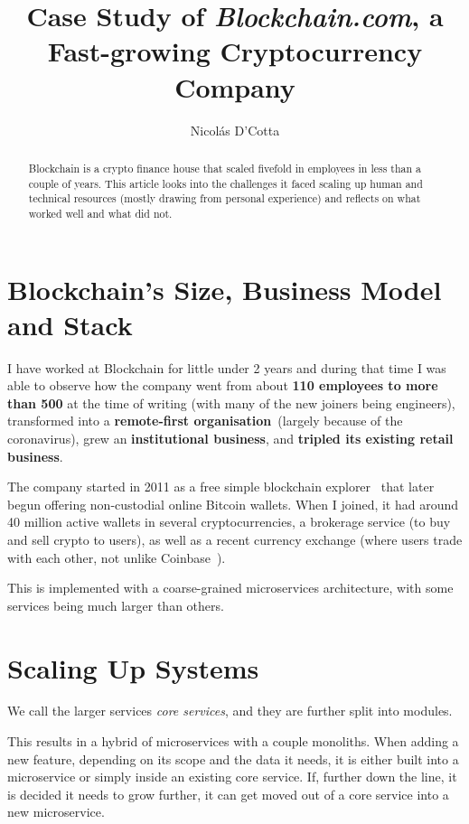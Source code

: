 \documentclass[conference]{IEEEtran}
\title{Case Study of \emph{Blockchain.com}, a Fast-growing Cryptocurrency Company}
\begin{document}
    \author{Nicolás D'Cotta}

    \maketitle

    \begin{abstract}
        Blockchain is a crypto finance house that scaled fivefold in
        employees in less than a couple of years.
        This article looks into the challenges it faced scaling up human and
        technical resources (mostly drawing from personal experience) and reflects
        on what worked well and what did not.
    \end{abstract}


    \section{Blockchain's Size, Business Model and Stack}\label{sec:business}

    I have worked at Blockchain for little under 2 years and during that time I was able to observe
    how the company went from about \textbf{110 employees to more than 500} at the time of writing (with many
    of the new joiners being engineers), transformed into a \textbf{remote-first organisation}~(largely because
    of the coronavirus), grew an \textbf{institutional business}, and \textbf{tripled its existing retail business}.

    The company started in 2011 as a free simple blockchain explorer~\cite{bcAbout} that later
    begun offering non-custodial online Bitcoin wallets.
    When I joined, it had around 40 million active wallets in several cryptocurrencies,
    a brokerage service (to buy and sell crypto to users), as well as a recent currency
    exchange (where users trade with each other, not unlike Coinbase~\cite{coinbasePro}).

    This is implemented with a coarse-grained microservices architecture, with some services
    being much larger than others.


    \section{Scaling Up Systems}
    We call the larger services \emph{core services}, and they are further split into modules.

    This results in a hybrid of microservices with a couple monoliths.
    When adding a new feature, depending on its scope and the data it needs, it is either built into
    a microservice or simply inside an existing core service.
    If, further down the line, it is decided it needs to grow further, it can get moved out of a
    core service into a new microservice.
\end{document}
